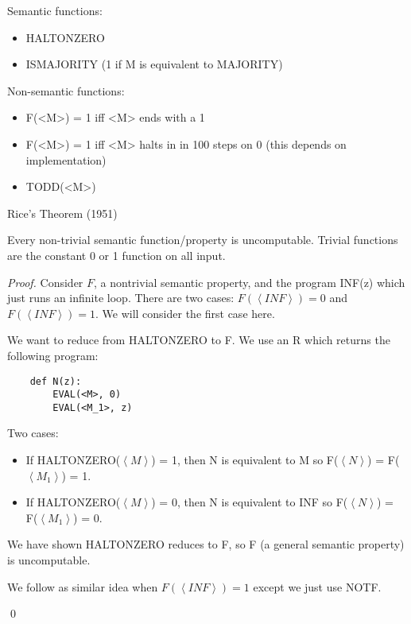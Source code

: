 \begin{example}
    
    Semantic functions:
    \begin{itemize}
        \item HALTONZERO
        \item ISMAJORITY (1 if M is equivalent to MAJORITY)
    \end{itemize}

    Non-semantic functions:
    \begin{itemize}
        \item F(<M>) = 1 iff <M> ends with a 1
        \item F(<M>) = 1 iff <M> halts in in 100 steps on 0 (this depends on implementation)
        \item TODD(<M>)
    \end{itemize}
\end{example}

\begin{theorem}
    Rice's Theorem (1951)

    Every non-trivial semantic function/property is uncomputable. Trivial functions are the constant 0 or 1 function on all input.
\end{theorem}

\begin{proof}
    
    Consider $F$, a nontrivial semantic property, and the program INF(z) which just runs an infinite loop. There are two cases: $F(\left<INF\right>) = 0$ and $F(\left<INF\right>) = 1$. We will consider the first case here. 

    We want to reduce from HALTONZERO to F. We use an R which returns the following program:

    \begin{verbatim}
    def N(z):
        EVAL(<M>, 0)
        EVAL(<M_1>, z)
    \end{verbatim}

    Two cases:
    \begin{itemize}
        \item If HALTONZERO($\left<M\right>$) = 1, then N is equivalent to M so F($\left<N\right>$) = F($\left<M_1\right>$) = 1.
        \item If HALTONZERO($\left<M\right>$) = 0, then N is equivalent to INF so F($\left<N\right>$) = F($\left<M_1\right>$) = 0.
    \end{itemize}

    We have shown HALTONZERO reduces to F, so F (a general semantic property) is uncomputable. 

    We follow as similar idea when $F(\left<INF\right>) = 1$ except we just use NOTF. 

    \qed
\end{proof}
